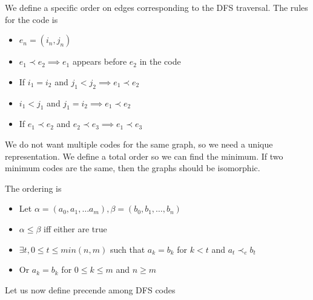     We define a specific order on edges corresponding to the DFS traversal. The rules for the code is
    \begin{itemize}
        \item $e_n = (i_n, j_n)$ 
        \item $e_1 \prec e_2 \implies e_1$ appears before $e_2$ in the code
        \item If $i_1 = i_2$ and $j_1 < j_2 \implies e_1 \prec e_2$ 
        \item $i_1 < j_1$ and $j_1 = i_2 \implies e_1 \prec e_2$
        \item If $e_1 \prec e_2$ and $e_2 \prec e_3 \implies e_1 \prec e_3$
    \end{itemize}
    
    We do not want multiple codes for the same graph, so we need a unique representation. We define a total order so we can find the minimum. If two minimum codes are the same, then the graphs should be isomorphic. 
    
    The ordering is 
    \begin{itemize}
        \item Let $\alpha = (a_0, a_1, \dots a_m), \beta = (b_0, b_1, \dots, b_n)$
        \item $\alpha \leq \beta$ iff either are true
        \item $\exists t, 0 \leq t \leq min(n, m)$ such that $a_k = b_k$ for $k < t$ and $a_t \prec_e b_t$
        \item Or $a_k = b_k$ for $0 \leq k \leq m$ and $n \geq m$
    \end{itemize}
    
    Let us now define precende among DFS codes
    
